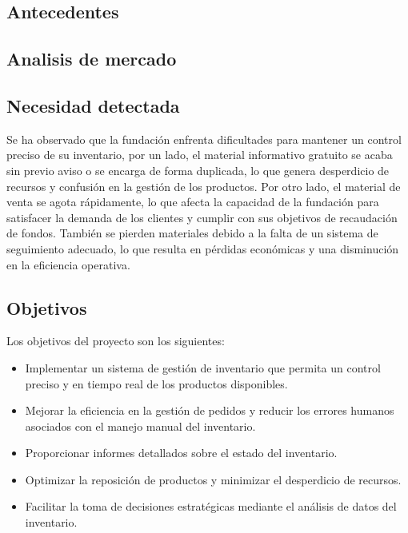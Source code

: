 \subsection{Antecedentes}\label{subsec:antecedentes}
\subsection{Analisis de mercado}\label{subsec:analisis-mercado}
\subsection{Necesidad detectada}\label{subsec:necesidad-detectada}
Se ha observado que la fundación enfrenta dificultades para mantener un control preciso de su inventario,
por un lado, el material informativo gratuito se acaba sin previo aviso o se encarga de forma duplicada, lo que genera desperdicio de recursos y confusión en la gestión de los productos.
Por otro lado, el material de venta se agota rápidamente, lo que afecta la capacidad de la fundación para satisfacer la demanda de los clientes y cumplir con sus objetivos de recaudación de fondos.
También se pierden materiales debido a la falta de un sistema de seguimiento adecuado, lo que resulta en pérdidas económicas y una disminución en la eficiencia operativa.

\subsection{Objetivos}\label{subsec:objetivos}
Los objetivos del proyecto son los siguientes:
\begin{itemize}
    \item Implementar un sistema de gestión de inventario que permita un control preciso y en tiempo real de los productos disponibles.
    \item Mejorar la eficiencia en la gestión de pedidos y reducir los errores humanos asociados con el manejo manual del inventario.
    \item Proporcionar informes detallados sobre el estado del inventario.
    \item Optimizar la reposición de productos y minimizar el desperdicio de recursos.
    \item Facilitar la toma de decisiones estratégicas mediante el análisis de datos del inventario.
\end{itemize}

